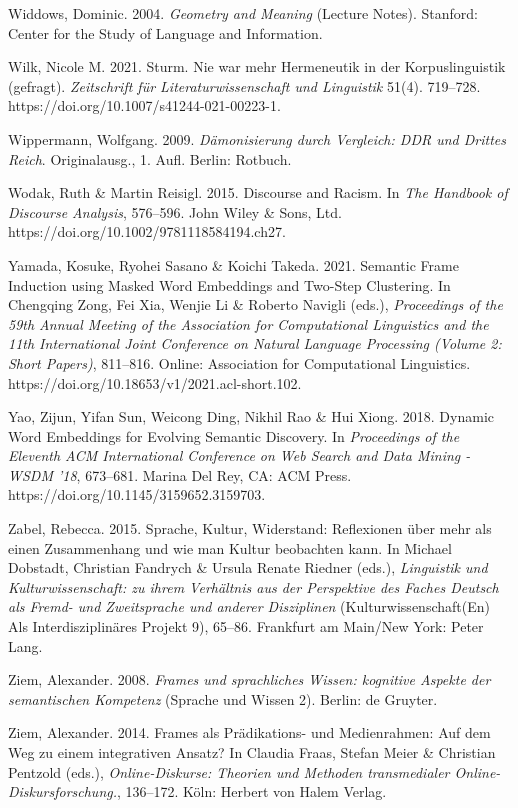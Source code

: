 Widdows, Dominic. 2004. \emph{Geometry and Meaning} (Lecture Notes). Stanford: Center for the Study of Language and Information.

Wilk, Nicole M. 2021. Sturm. Nie war mehr Hermeneutik in der Korpuslinguistik (gefragt). \emph{Zeitschrift für Literaturwissenschaft und Linguistik} 51(4). 719--728. https://doi.org/10.1007/s41244-021-00223-1.

Wippermann, Wolfgang. 2009. \emph{Dämonisierung durch Vergleich: DDR und Drittes Reich}. Originalausg., 1. Aufl. Berlin: Rotbuch.

Wodak, Ruth \& Martin Reisigl. 2015. Discourse and Racism. In \emph{The Handbook of Discourse Analysis}, 576--596. John Wiley \& Sons, Ltd. https://doi.org/10.1002/9781118584194.ch27.

Yamada, Kosuke, Ryohei Sasano \& Koichi Takeda. 2021. Semantic Frame Induction using Masked Word Embeddings and Two-Step Clustering. In Chengqing Zong, Fei Xia, Wenjie Li \& Roberto Navigli (eds.), \emph{Proceedings of the 59th Annual Meeting of the Association for Computational Linguistics and the 11th International Joint Conference on Natural Language Processing (Volume 2: Short Papers)}, 811--816. Online: Association for Computational Linguistics. https://doi.org/10.18653/v1/2021.acl-short.102.

Yao, Zijun, Yifan Sun, Weicong Ding, Nikhil Rao \& Hui Xiong. 2018. Dynamic Word Embeddings for Evolving Semantic Discovery. In \emph{Proceedings of the Eleventh ACM International Conference on Web Search and Data Mining - WSDM '18}, 673--681. Marina Del Rey, CA: ACM Press. https://doi.org/10.1145/3159652.3159703.

Zabel, Rebecca. 2015. Sprache, Kultur, Widerstand: Reflexionen über mehr als einen Zusammenhang und wie man Kultur beobachten kann. In Michael Dobstadt, Christian Fandrych \& Ursula Renate Riedner (eds.), \emph{Linguistik und Kulturwissenschaft: zu ihrem Verhältnis aus der Perspektive des Faches Deutsch als Fremd- und Zweitsprache und anderer Disziplinen} (Kulturwissenschaft(En) Als Interdisziplinäres Projekt 9), 65--86. Frankfurt am Main/New York: Peter Lang.

Ziem, Alexander. 2008. \emph{Frames und sprachliches Wissen: kognitive Aspekte der semantischen Kompetenz} (Sprache und Wissen 2). Berlin: de Gruyter.

Ziem, Alexander. 2014. Frames als Prädikations- und Medienrahmen: Auf dem Weg zu einem integrativen Ansatz? In Claudia Fraas, Stefan Meier \& Christian Pentzold (eds.), \emph{Online-Diskurse: Theorien und Methoden transmedialer Online-Diskursforschung.}, 136--172. Köln: Herbert von Halem Verlag.

